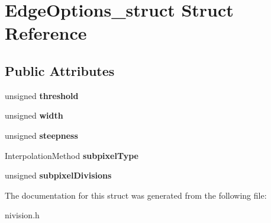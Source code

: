 \hypertarget{structEdgeOptions__struct}{\section{\-Edge\-Options\-\_\-struct \-Struct \-Reference}
\label{structEdgeOptions__struct}
}
\subsection*{\-Public \-Attributes}
\begin{DoxyCompactItemize}
\item 
\hypertarget{structEdgeOptions__struct_a6e92d0a0f29a65abb5461beaea1ff43d}{unsigned {\bfseries threshold}}\label{structEdgeOptions__struct_a6e92d0a0f29a65abb5461beaea1ff43d}

\item 
\hypertarget{structEdgeOptions__struct_aeab264285ad677497b2188c29692765b}{unsigned {\bfseries width}}\label{structEdgeOptions__struct_aeab264285ad677497b2188c29692765b}

\item 
\hypertarget{structEdgeOptions__struct_aec9f003b66b0678cd2497922d955053f}{unsigned {\bfseries steepness}}\label{structEdgeOptions__struct_aec9f003b66b0678cd2497922d955053f}

\item 
\hypertarget{structEdgeOptions__struct_a2197d3454703243ae3051334ac2c1045}{\-Interpolation\-Method {\bfseries subpixel\-Type}}\label{structEdgeOptions__struct_a2197d3454703243ae3051334ac2c1045}

\item 
\hypertarget{structEdgeOptions__struct_a5eae9518a3812627939d136c9345f80e}{unsigned {\bfseries subpixel\-Divisions}}\label{structEdgeOptions__struct_a5eae9518a3812627939d136c9345f80e}

\end{DoxyCompactItemize}


\-The documentation for this struct was generated from the following file\-:\begin{DoxyCompactItemize}
\item 
nivision.\-h\end{DoxyCompactItemize}
